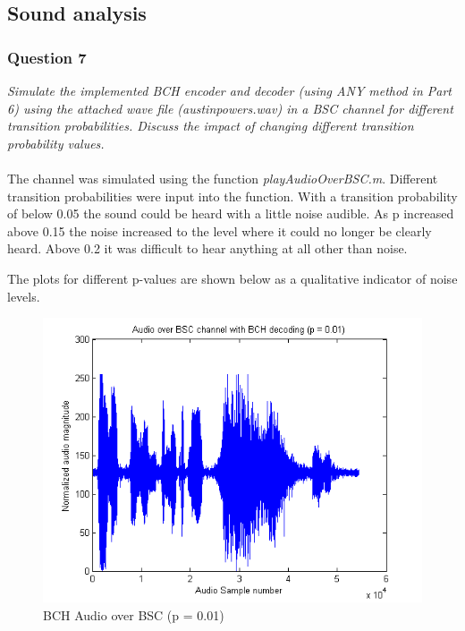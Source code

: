\documentclass[a4paper]{article}
\begin{document}
\subsection{Sound analysis}

\subsubsection{Question 7} \textit{Simulate the implemented BCH encoder and decoder (using ANY method in Part 6) using the attached wave file (austinpowers.wav) in a BSC channel for different transition probabilities. Discuss the impact of changing different transition probability values.}\\
\\
The channel was simulated using the function \textit{playAudioOverBSC.m}. Different transition probabilities were input into the function. With a transition probability of below 0.05 the sound could be heard with a little noise audible. As p increased above 0.15 the noise increased to the level where it could no longer be clearly heard. Above 0.2 it was difficult to hear anything at all other than noise.

The plots for different p-values are shown below as a qualitative indicator of noise levels.

\begin{figure}[H]
\centering
\includegraphics[scale=0.5]{plots/audio_over_bsc_bch_p_001.png}
\caption{BCH Audio over BSC (p = 0.01)}
\end{figure}
\end{document}
